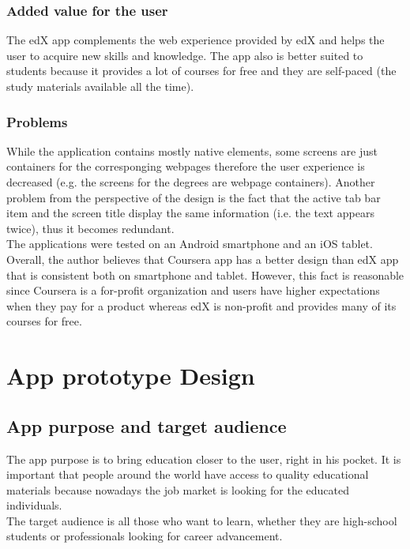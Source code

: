 \documentclass[version=last,fontsize=13pt]{scrartcl}
\begin{document}
		\subsubsection{Added value for the user}
		The edX app complements the web experience provided by edX and helps the user to acquire new skills and knowledge. The app also is better suited to students because it provides a lot of courses for free and they are self-paced (the study materials available all the time). 

		\subsubsection{Problems}
		While the application contains mostly native elements, some screens are just containers for the  corresponging webpages therefore the user experience is decreased (e.g. the screens for the degrees are webpage containers). Another problem from the perspective of the design is the fact that the active tab bar item and the screen title display the same information (i.e. the text appears twice), thus it becomes redundant.\\

		The applications were tested on an Android smartphone and an iOS tablet. Overall, the author believes that Coursera app has a better design than edX app that is consistent both on smartphone and tablet. However, this fact is reasonable since Coursera is a for-profit organization and users have higher expectations when they pay for a product whereas edX is non-profit and provides many of its courses for free.

		


\newpage

\section{App prototype Design}
	\subsection{App purpose and target audience}
		The app purpose is to bring education closer to the user, right in his pocket. It is important that people around the world have access to quality educational materials because nowadays the job market is looking for the educated individuals. \\
		\indent
		The target audience is all those who want to learn, whether they are high-school students or professionals looking for career advancement. 
\end{document}
